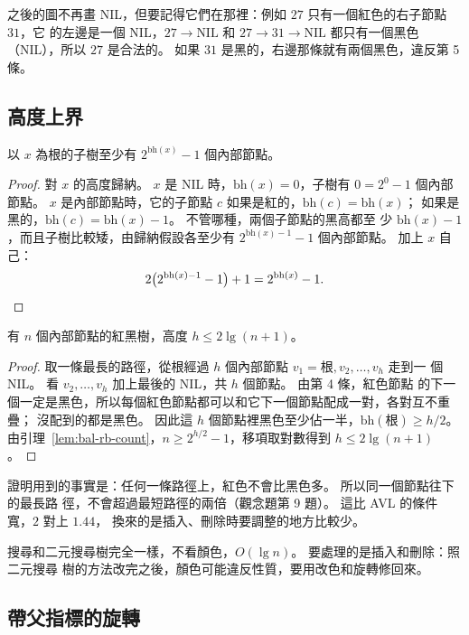 之後的圖不再畫 NIL，但要記得它們在那裡：例如 $27$ 只有一個紅色的右子節點 $31$，它
的左邊是一個 NIL，$27 \to \text{NIL}$ 和 $27 \to 31 \to \text{NIL}$ 都只有一個黑色
（NIL），所以 $27$ 是合法的。 如果 $31$ 是黑的，右邊那條就有兩個黑色，違反第 5 條。

\subsection{高度上界}

\begin{lemma}
\label{lem:bal-rb-count}
以 $x$ 為根的子樹至少有 $2^{\mathrm{bh}(x)} - 1$ 個內部節點。
\end{lemma}

\begin{proof}
對 $x$ 的高度歸納。 $x$ 是 NIL 時，$\mathrm{bh}(x) = 0$，子樹有 $0 = 2^0 - 1$ 個內部
節點。 $x$ 是內部節點時，它的子節點 $c$ 如果是紅的，$\mathrm{bh}(c) = \mathrm{bh}(x)$；
如果是黑的，$\mathrm{bh}(c) = \mathrm{bh}(x) - 1$。 不管哪種，兩個子節點的黑高都至
少 $\mathrm{bh}(x) - 1$，而且子樹比較矮，由歸納假設各至少有 $2^{\mathrm{bh}(x)-1} - 1$
個內部節點。 加上 $x$ 自己：
\[
2\bigl(2^{\mathrm{bh}(x)-1} - 1\bigr) + 1 = 2^{\mathrm{bh}(x)} - 1. \qedhere
\]
\end{proof}

\begin{theorem}
\label{thm:bal-rb-height}
有 $n$ 個內部節點的紅黑樹，高度 $h \le 2 \lg(n + 1)$。
\end{theorem}

\begin{proof}
取一條最長的路徑，從根經過 $h$ 個內部節點 $v_1 = \text{根}, v_2, \ldots, v_h$ 走到一
個 NIL。 看 $v_2, \ldots, v_h$ 加上最後的 NIL，共 $h$ 個節點。 由第 4 條，紅色節點
的下一個一定是黑色，所以每個紅色節點都可以和它下一個節點配成一對，各對互不重疊；
沒配到的都是黑色。 因此這 $h$ 個節點裡黑色至少佔一半，$\mathrm{bh}(\text{根}) \ge
h/2$。 由引理~\ref{lem:bal-rb-count}，$n \ge 2^{h/2} - 1$，移項取對數得到
$h \le 2\lg(n+1)$。
\end{proof}

證明用到的事實是：任何一條路徑上，紅色不會比黑色多。 所以同一個節點往下的最長路
徑，不會超過最短路徑的兩倍（觀念題第 9 題）。 這比 AVL 的條件寬，$2$ 對上 $1.44$，
換來的是插入、刪除時要調整的地方比較少。

搜尋和二元搜尋樹完全一樣，不看顏色，$O(\lg n)$。 要處理的是插入和刪除：照二元搜尋
樹的方法改完之後，顏色可能違反性質，要用改色和旋轉修回來。

\subsection{帶父指標的旋轉}

